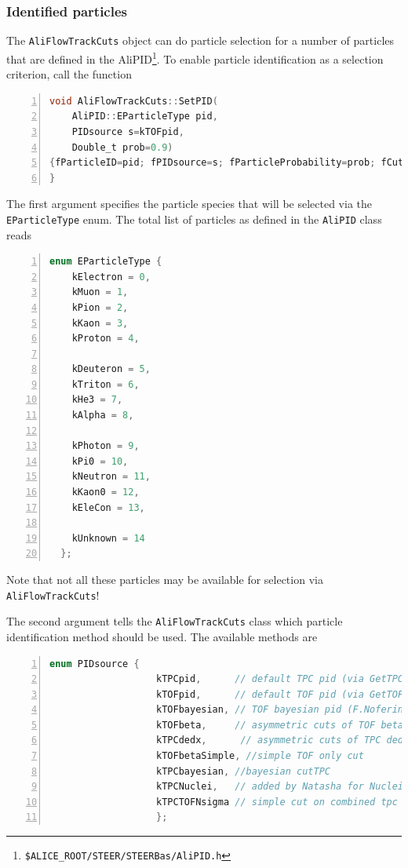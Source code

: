 \documentclass[a4paper]{book}
\numberwithin{equation}{subsection}
\begin{document}
\subsubsection{Identified particles}
The \texttt{AliFlowTrackCuts} object can do particle selection for a number of particles that are defined in the AliPID\footnote{\texttt{\$ALICE\_ROOT/STEER/STEERBas/AliPID.h}}. To enable 
particle identification as a selection criterion, call the function
\begin{lstlisting}[language=C, numbers=left]
void AliFlowTrackCuts::SetPID(
    AliPID::EParticleType pid, 
    PIDsource s=kTOFpid, 
    Double_t prob=0.9)
{fParticleID=pid; fPIDsource=s; fParticleProbability=prob; fCutPID=kTRUE; InitPIDcuts();
}\end{lstlisting}
The first argument specifies the particle species that will be selected via the \texttt{EParticleType} enum. The total list of particles as defined in the  \texttt{AliPID} class reads
\begin{lstlisting}[language=C, numbers=left]
  enum EParticleType {
    kElectron = 0, 
    kMuon = 1, 
    kPion = 2, 
    kKaon = 3, 
    kProton = 4, 

    kDeuteron = 5,
    kTriton = 6,
    kHe3 = 7,
    kAlpha = 8,
    
    kPhoton = 9,
    kPi0 = 10, 
    kNeutron = 11, 
    kKaon0 = 12, 
    kEleCon = 13,
    
    kUnknown = 14
  };\end{lstlisting}
  Note that not all these particles may be available for selection via \texttt{AliFlowTrackCuts}!
  
  The second argument tells the \texttt{AliFlowTrackCuts} class which particle identification method should be used. The available methods are
  \begin{lstlisting}[language=C, numbers=left]
    enum PIDsource {
                   kTPCpid,      // default TPC pid (via GetTPCpid)
                   kTOFpid,      // default TOF pid (via GetTOFpid)
                   kTOFbayesian, // TOF bayesian pid (F.Noferini)
                   kTOFbeta,     // asymmetric cuts of TOF beta signal
                   kTPCdedx,      // asymmetric cuts of TPC dedx signal
                   kTOFbetaSimple, //simple TOF only cut
                   kTPCbayesian, //bayesian cutTPC
		           kTPCNuclei,   // added by Natasha for Nuclei
                   kTPCTOFNsigma // simple cut on combined tpc tof nsigma
                   };\end{lstlisting}
                   
\end{document}
